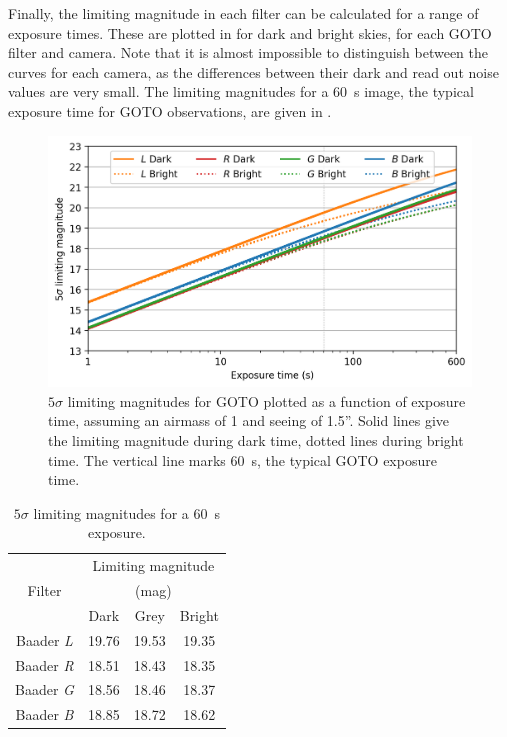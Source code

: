\begin{colsection}
\begin{colsection}
Finally, the limiting magnitude in each filter can be calculated for a range of exposure times. These are plotted in  for dark and bright skies, for each GOTO filter and camera. Note that it is almost impossible to distinguish between the curves for each camera, as the differences between their dark and read out noise values are very small. The limiting magnitudes for a \SI{60}{\second} image, the typical exposure time for GOTO observations, are given in .

\begin{figure}[t]
    \begin{center}
        \includegraphics[width=\textwidth]{images/throughput/limiting_mag.png}
    \end{center}
    \caption[$5\sigma$ limiting magnitudes for GOTO]{
        $5\sigma$ limiting magnitudes for GOTO plotted as a function of exposure time, assuming an airmass of 1 and seeing of 1.5''. Solid lines give the limiting magnitude during dark time, dotted lines during bright time. The vertical line marks \SI{60}{\second}, the typical GOTO exposure time.
    }\label{fig:lim_mags}
\end{figure}

\begin{table}[t]
    \begin{center}
        \begin{tabular}{c|ccc} %
                   & \multicolumn{3}{c}{Limiting magnitude} \\
            Filter & \multicolumn{3}{c}{(mag)} \\
                   & Dark & Grey & Bright \\
            \midrule
            Baader \textit{L} & 19.76 & 19.53 & 19.35 \\
            Baader \textit{R} & 18.51 & 18.43 & 18.35 \\
            Baader \textit{G} & 18.56 & 18.46 & 18.37 \\
            Baader \textit{B} & 18.85 & 18.72 & 18.62 \\
        \end{tabular}
    \end{center}
    \caption[$5\sigma$ limiting magnitudes for a \SI{60}{\second} exposure]{
        $5\sigma$ limiting magnitudes for a \SI{60}{\second} exposure.
    }\label{tab:lim_mags}
\end{table}


\end{colsection}
\end{colsection}
